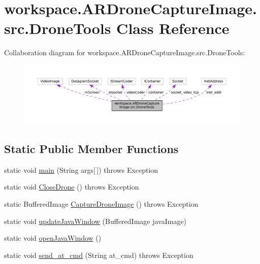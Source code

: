 \hypertarget{classworkspace_1_1_a_r_drone_capture_image_1_1src_1_1_drone_tools}{}\section{workspace.\+A\+R\+Drone\+Capture\+Image.\+src.\+Drone\+Tools Class Reference}
\label{classworkspace_1_1_a_r_drone_capture_image_1_1src_1_1_drone_tools}


Collaboration diagram for workspace.\+A\+R\+Drone\+Capture\+Image.\+src.\+Drone\+Tools\+:\nopagebreak
\begin{figure}[H]
\begin{center}
\leavevmode
\includegraphics[width=350pt]{classworkspace_1_1_a_r_drone_capture_image_1_1src_1_1_drone_tools__coll__graph}
\end{center}
\end{figure}
\subsection*{Static Public Member Functions}
\begin{DoxyCompactItemize}
\item 
static void \hyperlink{classworkspace_1_1_a_r_drone_capture_image_1_1src_1_1_drone_tools_a92aeefa5f533e5d4e55cd5ac86664f02}{main} (String args\mbox{[}$\,$\mbox{]})  throws Exception 
\item 
static void \hyperlink{classworkspace_1_1_a_r_drone_capture_image_1_1src_1_1_drone_tools_a11c422d53a80fe301d792bcc857e4aef}{Close\+Drone} ()  throws Exception 
\item 
static Buffered\+Image \hyperlink{classworkspace_1_1_a_r_drone_capture_image_1_1src_1_1_drone_tools_a095e49b01ac341b6a4e7b139617ae20e}{Capture\+Drone\+Image} ()  throws Exception 
\item 
static void \hyperlink{classworkspace_1_1_a_r_drone_capture_image_1_1src_1_1_drone_tools_a7bb40703a428b63ed0f23b9a22b72d36}{update\+Java\+Window} (Buffered\+Image java\+Image)
\item 
static void \hyperlink{classworkspace_1_1_a_r_drone_capture_image_1_1src_1_1_drone_tools_a3e245a974db9962604d25269975692e2}{open\+Java\+Window} ()
\item 
static void \hyperlink{classworkspace_1_1_a_r_drone_capture_image_1_1src_1_1_drone_tools_ae515c96a2274175cf7b5bda1893aa16f}{send\+\_\+at\+\_\+cmd} (String at\+\_\+cmd)  throws Exception 
\end{DoxyCompactItemize}
